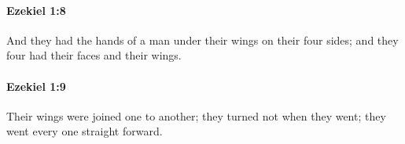 		\paragraph{Ezekiel 1:8} %
			\label{EZEKIEL-1-8}

			And they had the hands of a man under their wings on their four sides; and they four had their faces and their wings.


		\paragraph{Ezekiel 1:9} %
			\label{EZEKIEL-1-9}

			Their wings were joined one to another; they turned not when they went; they went every one straight forward.


